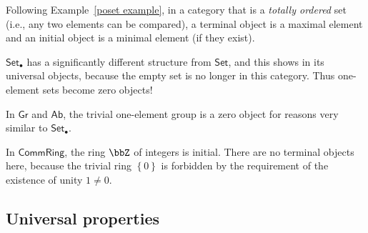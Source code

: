 \begin{example}
    Following Example~\ref{poset example}, in a category that is a \emph{totally ordered} set (i.e., any two elements can be compared), a terminal object is a maximal element and an initial object is a minimal element (if they exist).
\end{example}
%
\begin{example}
    $\mathsf{Set}_{\bullet}$ has a significantly different structure
    from $\mathsf{Set}$, and this shows in its universal objects, because
    the empty set is no longer in this category. Thus one-element sets
    become zero objects!
\end{example}
%
\begin{example}
    In $\mathsf{Gr}$ and $\mathsf{Ab}$, the trivial one-element group
    is a zero object for reasons very similar to $\mathsf{Set}_{\bullet}$.
\end{example}
%
\begin{example}
    In $\mathsf{CommRing}$, the ring $\bbZ$ of integers is initial.
    There are no terminal objects here, because the trivial ring $\left\{ 0\right\} $
    is forbidden by the requirement of the existence of unity $1\neq0$.
\end{example}
%

\subsection{Universal properties}

